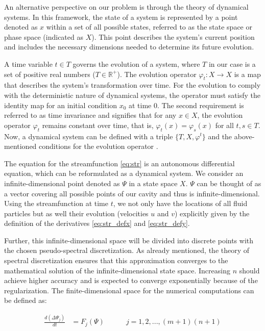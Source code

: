An alternative perspective on our problem is through the theory of dynamical
systems. In this framework, the state of a system is represented by a point
denoted as $x$ within a set of all possible states, referred to as the state
space or phase space (indicated as $X$). This point describes the system's
current position and includes the necessary dimensions needed to determine its
future evolution.

A time variable $t \in T$ governs the evolution of a system, where $T$ in our
case is a set of positive real numbers ($T \in \mathbb{R}^+$). The evolution
operator $\varphi_t : X \to X$ is a map that describes the system's
transformation over time. For the evolution to comply with the deterministic
nature of dynamical systems, the operator must satisfy the identity map for an
initial condition $x_0$ at time $0$. The second requirement is referred to as
time invariance and signifies that for any $x \in X$, the evolution operator
$\varphi_t$ remains constant over time, that is, $\varphi_t(x) = \varphi_s(x)$
for all $t, s \in T$. Now, a dynamical system can be defined with a triple $\{
T, X, \varphi^t \}$ and the above-mentioned conditions for the evolution
operator \citep{kuznetsov2004}.

The equation for the streamfunction \eqref{eq:str} is an autonomous
differential equation, which can be reformulated as a dynamical system. We
consider an infinite-dimensional point denoted as $\Psi$ in a state space $X$.
$\Psi$ can be thought of as a vector covering all possible points of our cavity
and thus is infinite-dimensional. Using the streamfunction at time $t$, we not
only have the locations of all fluid particles but as well their evolution
(velocities $u$ and $v$) explicitly given by the definition of the derivatives
\eqref{eq:str_defx} and \eqref{eq:str_defy}.

Further, this infinite-dimensional space will be divided into discrete points
with the chosen pseudo-spectral discretization. As already mentioned, the
theory of spectral discretization ensures that this approximation converges to
the mathematical solution of the infinite-dimensional state space. Increasing
$n$ should achieve higher accuracy and is expected to converge exponentially
because of the regularization. The finite-dimensional space for the numerical
computations can be defined as:

\begin{align}
  \frac{d(\Delta \Psi_j)}{dt} &= {F_j(\Psi)} \quad \quad \quad
    j= 1,2, ...,(m+1)(n+1) \label{eq:dyn_sys}
\end{align}

